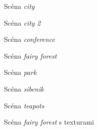\documentclass[11pt]{article}
\begin{document}
\begin{figure}[h]
\setlength\fboxsep{1pt}
\centerline{}
\caption{Scéna \emph{city}}
\end{figure}

\begin{figure}[h]
\setlength\fboxsep{1pt}
\centerline{}
\caption{Scéna \emph{city 2}}
\end{figure}

\begin{figure}[h]
\setlength\fboxsep{1pt}
\centerline{}
\caption{Scéna \emph{conference}}
\end{figure}

\begin{figure}[h]
\setlength\fboxsep{1pt}
\centerline{}
\caption{Scéna \emph{fairy forest}}
\end{figure}

\begin{figure}[h]
\setlength\fboxsep{1pt}
\centerline{}
\caption{Scéna \emph{park}}
\end{figure}

\begin{figure}[h]
\setlength\fboxsep{1pt}
\centerline{}
\caption{Scéna \emph{sibenik}}
\end{figure}

\begin{figure}[h]
\setlength\fboxsep{1pt}
\centerline{}
\caption{Scéna \emph{teapots}}
\end{figure}

\begin{figure}[h]
\setlength\fboxsep{1pt}
\centerline{}
\caption{Scéna \emph{fairy forest} s texturami}
\end{figure}
\end{document}
